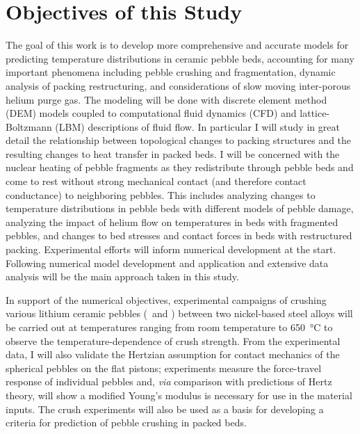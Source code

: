 \section{Objectives of this Study}\label{sec:intro-scope-of-work}
The goal of this work is to develop more comprehensive and accurate models for predicting temperature distributions in ceramic pebble beds, accounting for many important phenomena including pebble crushing and fragmentation, dynamic analysis of packing restructuring, and considerations of slow moving inter-porous helium purge gas. The modeling will be done with discrete element method (DEM) models coupled to computational fluid dynamics (CFD) and lattice-Boltzmann (LBM) descriptions of fluid flow. In particular I will study in great detail the relationship between topological changes to packing structures and the resulting changes to heat transfer in packed beds. I will be concerned with the nuclear heating of pebble fragments as they redistribute through pebble beds and come to rest without strong mechanical contact (and therefore contact conductance) to neighboring pebbles. This includes analyzing changes to temperature distributions in pebble beds with different models of pebble damage, analyzing the impact of helium flow on temperatures in beds with fragmented pebbles, and changes to bed stresses and contact forces in beds with restructured packing. Experimental efforts will inform numerical development at the start. Following numerical model development and application and extensive data analysis will be the main approach taken in this study.

In support of the numerical objectives, experimental campaigns of crushing various lithium ceramic pebbles (\lit~and \lis) between two nickel-based steel alloys will be carried out at temperatures ranging from room temperature to \SI{650}{\celsius} to observe the temperature-dependence of crush strength. From the experimental data, I will also validate the Hertzian assumption for contact mechanics of the spherical pebbles on the flat pistons; experiments measure the force-travel response of individual pebbles and, \textit{via} comparison with predictions of Hertz theory, will show a modified Young's modulus is necessary for use in the material inputs. The crush experiments will also be used as a basis for developing a criteria for prediction of pebble crushing in packed beds. 


